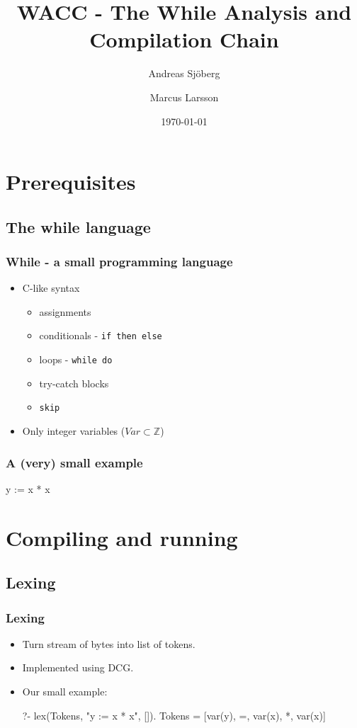 \documentclass[]{beamer}
\title{WACC - The While Analysis and Compilation Chain}
\author{Andreas Sjöberg \and Marcus Larsson}
\institute{KTH}
\date{\today}
\begin{document}
\begin{frame}
  \titlepage
\end{frame}

\section[Outline]{}

\begin{frame}
  \tableofcontents
\end{frame}

\section{Prerequisites}

\subsection{The while language}
\begin{frame}[fragile]
	\frametitle{While - a small programming language}
	\begin{itemize}
		\item C-like syntax
			\begin{itemize} 
				\item assignments
				\item conditionals -  \verb|if then else |
				\item loops - \verb|while do|
				\item try-catch blocks
				\item \verb!skip!
			\end{itemize}
		\item Only integer variables ($Var \subset \mathbb{Z} $)
	\end{itemize}
\end{frame}

\begin{frame}[fragile]
	\frametitle{A (very) small example}
\begin{boxedverbatim}
y := x * x
\end{boxedverbatim}
\end{frame}

\section{Compiling and running}

\subsection{Lexing}
\begin{frame}[fragile]
\frametitle{Lexing}
\begin{itemize}
	\item Turn stream of bytes into list of tokens.
	\item Implemented using DCG.
	\item Our small example:
\begin{boxedverbatim}
?- lex(Tokens, "y := x * x", []).
Tokens = [var(y), =, var(x), *, var(x)]
\end{boxedverbatim}
\end{itemize}
\end{frame}
\end{document}
